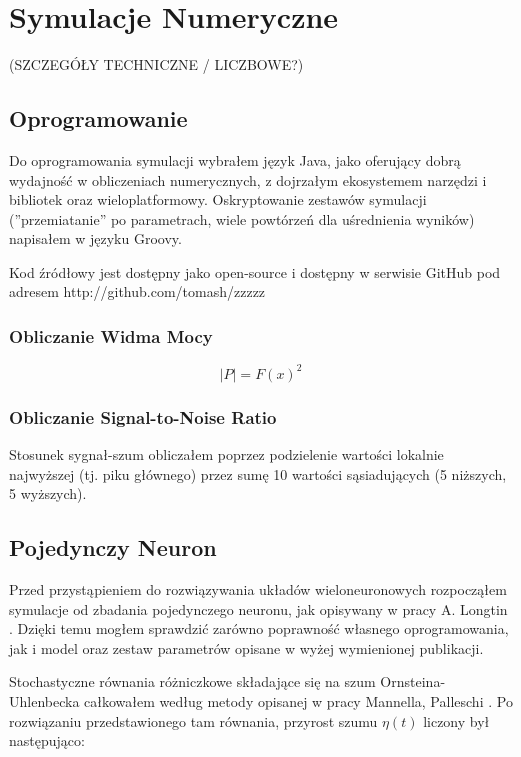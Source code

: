   \section{Symulacje Numeryczne}
  
  (SZCZEGÓŁY TECHNICZNE / LICZBOWE?)
  
  
  \subsection{Oprogramowanie}

  Do oprogramowania symulacji wybrałem język Java, jako oferujący dobrą wydajność w obliczeniach numerycznych, z dojrzałym ekosystemem narzędzi i bibliotek oraz wieloplatformowy. Oskryptowanie zestawów symulacji (''przemiatanie'' po parametrach, wiele powtórzeń dla uśrednienia wyników) napisałem w języku Groovy.
  
  Kod źródłowy jest dostępny jako open-source i dostępny w serwisie GitHub pod adresem http://github.com/tomash/zzzzz

  \subsubsection{Obliczanie Widma Mocy}

  \begin{equation}
    |P| = F(x)^2
  \end{equation}

  \subsubsection{Obliczanie Signal-to-Noise Ratio}

  Stosunek sygnał-szum obliczałem poprzez podzielenie wartości lokalnie najwyższej (tj. piku głównego) przez sumę 10 wartości sąsiadujących (5 niższych, 5 wyższych).
  
  \subsection{Pojedynczy Neuron}
  
  Przed przystąpieniem do rozwiązywania układów wieloneuronowych rozpocząłem symulacje od zbadania pojedynczego neuronu, jak opisywany w pracy A. Longtin \cite{longtin}. Dzięki temu mogłem sprawdzić zarówno poprawność własnego oprogramowania, jak i model oraz zestaw parametrów opisane w wyżej wymienionej publikacji.
  
  Stochastyczne równania różniczkowe składające się na szum Ornsteina-Uhlenbecka całkowałem według metody opisanej w pracy Mannella, Palleschi \cite{mannella}. Po rozwiązaniu przedstawionego tam równania, przyrost szumu $\eta (t)$ liczony był następująco:

